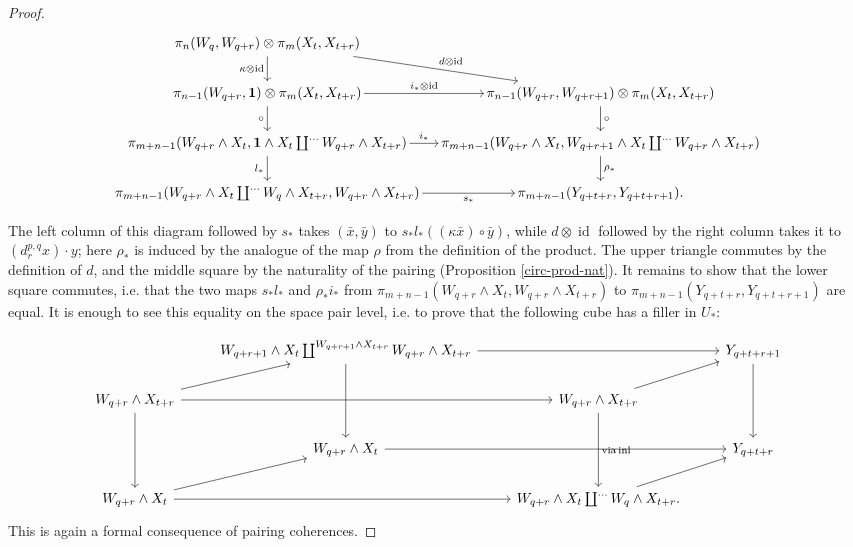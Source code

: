 \documentclass{amsart}
\theoremstyle{definition}
\newcommand{\id}{\operatorname{id}}
\newcommand{\inl}{\operatorname{inl}}
\newcommand{\sgtn}{\mathbf{1}}
\begin{document}
\begin{proof}
\[\begin{tikzcd}[column sep=small, cells={inner xsep=0.4ex}]
	{\pi_n(W_q, W_{q+r}) \otimes \pi_m(X_t, X_{t+r})} \\
	{\pi_{n-1}(W_{q+r}, \sgtn) \otimes \pi_m(X_t, X_{t+r})} & {\pi_{n-1}(W_{q+r}, W_{q+r+1}) \otimes \pi_m(X_t, X_{t+r})} \\
	{\pi_{m+n-1}(W_{q+r} \wedge X_t, \sgtn \wedge X_t \coprod^{\ldots} W_{q+r} \wedge X_{t+r})} & {\pi_{m+n-1}(W_{q+r} \wedge X_t, W_{q+r+1} \wedge X_t \coprod^{\ldots} W_{q+r} \wedge X_{t+r})} \\
	{\pi_{m+n-1}(W_{q+r} \wedge X_{t} \coprod^{\ldots} W_{q} \wedge X_{t+r}, W_{q+r} \wedge X_{t+r})} & {\pi_{m+n-1}(Y_{q+t+r}, Y_{q+t+r+1}).}
	\arrow["{\kappa \otimes \id}"', from=1-1, to=2-1]
	\arrow["{d \otimes \id}", from=1-1, to=2-2]
	\arrow["{i_* \otimes \id}", from=2-1, to=2-2]
	\arrow["\circ"', from=2-1, to=3-1]
	\arrow["\circ", from=2-2, to=3-2]
	\arrow["{i_*}", from=3-1, to=3-2]
	\arrow["{l_*}"', from=3-1, to=4-1]
	\arrow["{\rho_*}", from=3-2, to=4-2]
	\arrow["{s_*}"', from=4-1, to=4-2]
\end{tikzcd}\]


The left column of this diagram followed by $s_*$ takes $(\bar{x}, \bar{y})$ to $s_* l_*((\kappa \bar{x}) \circ \bar{y})$, while $d \otimes \id$ followed by the right column takes it to $(d_r^{p,q} x) \cdot y$; here $\rho_*$ is induced by the analogue of the map $\rho$ from the definition of the product. The upper triangle commutes by the definition of $d$, and the middle square by the naturality of the pairing (Proposition \ref{circ-prod-nat}). It remains to show that the lower square commutes, i.e. that the two maps $s_* l_*$ and $\rho_* i_*$ from $\pi_{m+n-1}(W_{q+r} \wedge X_t, W_{q+r} \wedge X_{t+r})$ to $\pi_{m+n-1}(Y_{q+t+r}, Y_{q+t+r+1})$ are equal. It is enough to see this equality on the space pair level, i.e. to prove that the following cube has a filler in $U_*$:

\[\begin{tikzcd}
	& { W_{q+r+1} \wedge X_t \coprod^{W_{q+r+1} \wedge X_{t+r}} W_{q+r} \wedge X_{t+r}} && {Y_{q+t+r+1}} \\
	{W_{q+r} \wedge X_{t+r}} && {W_{q+r} \wedge X_{t+r}} \\
	& {W_{q+r} \wedge X_t} && {Y_{q+t+r}} \\
	{W_{q+r} \wedge X_t} && {W_{q+r} \wedge X_{t} \coprod^{\ldots} W_{q} \wedge X_{t+r}.}
	\arrow[from=1-2, to=1-4]
	\arrow[from=1-2, to=3-2]
	\arrow[from=1-4, to=3-4]
	\arrow[from=2-1, to=1-2]
	\arrow[from=2-1, to=2-3]
	\arrow[from=2-1, to=4-1]
	\arrow[from=2-3, to=1-4]
	\arrow["{\operatorname{via } \inl }", from=2-3, to=4-3]
	\arrow[from=3-2, to=3-4]
	\arrow[from=4-1, to=3-2]
	\arrow[from=4-1, to=4-3]
	\arrow[from=4-3, to=3-4]
\end{tikzcd}\]
This is again a formal consequence of pairing coherences.


\end{proof}
\end{document}
